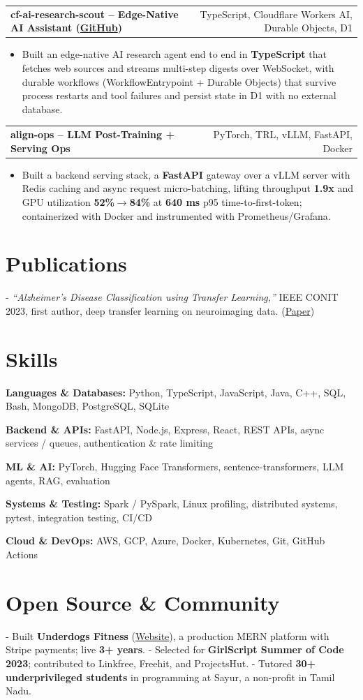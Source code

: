 \documentclass[letterpaper,11pt]{article}
\makeatletter
\newcommand{\projItem}[2]{%
  \vspace{2pt}
  \begin{tabular*}{\textwidth}{@{}l@{\extracolsep{\fill}}r@{}}
    \textbf{#1} & #2 \\
  \end{tabular*}\par\vspace{-3pt}
}
\newcommand{\skillLine}[2]{\textbf{#1:} #2\par\vspace{1.5pt}}
\newcommand{\inlineBlock}[1]{{\setlength{\leftskip}{0.18in}\small #1\par}}
\makeatother
\begin{document}
\projItem{cf-ai-research-scout -- Edge-Native AI Assistant {\normalfont\small(\href{https://github.com/Deva-1903/cf_ai_research_scout}{GitHub})}}{TypeScript, Cloudflare Workers AI, Durable Objects, D1}
\begin{itemize}
  \item Built an edge-native AI research agent end to end in \textbf{TypeScript} that fetches web sources and streams multi-step digests over WebSocket, with durable workflows (WorkflowEntrypoint + Durable Objects) that survive process restarts and tool failures and persist state in D1 with no external database.
\end{itemize}

\projItem{align-ops -- LLM Post-Training + Serving Ops}{PyTorch, TRL, vLLM, FastAPI, Docker}
\begin{itemize}
  \item Built a backend serving stack, a \textbf{FastAPI} gateway over a vLLM server with Redis caching and async request micro-batching, lifting throughput \textbf{1.9x} and GPU utilization \textbf{52\%$\to$84\%} at \textbf{640 ms} p95 time-to-first-token; containerized with Docker and instrumented with Prometheus/Grafana.
\end{itemize}

\section{Publications}
\vspace{2pt}
\inlineBlock{- \textit{``Alzheimer's Disease Classification using Transfer Learning,''} IEEE CONIT 2023, first author, deep transfer learning on neuroimaging data. {\normalfont\small(\href{https://ieeexplore.ieee.org/document/10205760}{Paper})}}

\section{Skills}
\skillLine{Languages \& Databases}{Python, TypeScript, JavaScript, Java, C++, SQL, Bash, MongoDB, PostgreSQL, SQLite}
\skillLine{Backend \& APIs}{FastAPI, Node.js, Express, React, REST APIs, async services / queues, authentication \& rate limiting}
\skillLine{ML \& AI}{PyTorch, Hugging Face Transformers, sentence-transformers, LLM agents, RAG, evaluation}
\skillLine{Systems \& Testing}{Spark / PySpark, Linux profiling, distributed systems, pytest, integration testing, CI/CD}
\skillLine{Cloud \& DevOps}{AWS, GCP, Azure, Docker, Kubernetes, Git, GitHub Actions}

\section{Open Source \& Community}
\inlineBlock{- Built \textbf{Underdogs Fitness} (\href{https://www.underdogsfitness.in/}{Website}), a production MERN platform with Stripe payments; live \textbf{3+ years}. - Selected for \textbf{GirlScript Summer of Code 2023}; contributed to Linkfree, Freehit, and ProjectsHut. - Tutored \textbf{30+ underprivileged students} in programming at Sayur, a non-profit in Tamil Nadu.}
\end{document}
